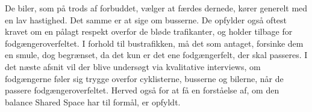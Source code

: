 De biler, som på trods af forbuddet, vælger at færdes dernede, kører generelt med en lav hastighed. Det samme er at sige om busserne. De opfylder også oftest kravet om en pålagt respekt overfor de bløde trafikanter, og holder tilbage for fodgængeroverfeltet. I forhold til bustrafikken, må det som antaget, forsinke dem en smule, dog begrænset, da det kun er det ene fodgængerfelt, der skal passeres. 
I det næste afsnit vil der blive undersøgt via kvalitative interviews, om fodgængerne føler sig trygge overfor cyklisterne, busserne og bilerne, når de passere fodgængeroverfeltet. Herved også for at få en forståelse af, om den balance Shared Space har til formål, er opfyldt.
